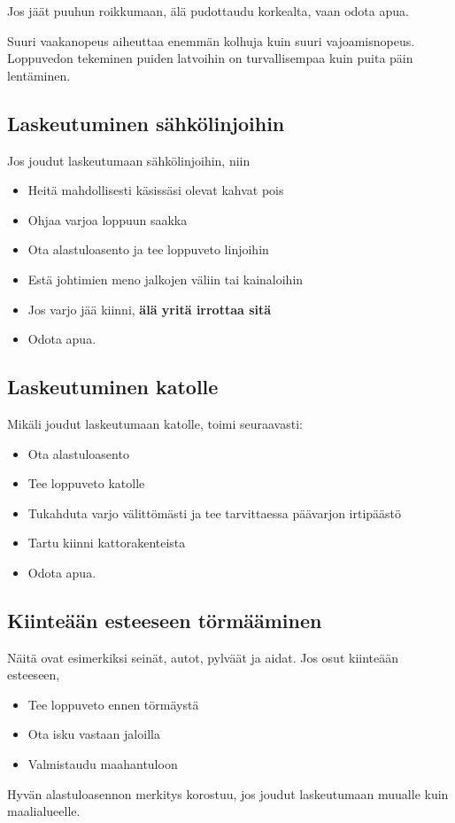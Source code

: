 Jos jäät puuhun roikkumaan, älä pudottaudu korkealta, vaan odota apua. 


Suuri vaakanopeus aiheuttaa enemmän kolhuja kuin suuri vajoamisnopeus. Loppuvedon tekeminen puiden latvoihin on turvallisempaa kuin puita päin lentäminen. 

\subsection{ Laskeutuminen sähkölinjoihin }
\label{mahdolliset-vaaratilanteet-laskeutuminen-sahkolinjoihin}


Jos joudut laskeutumaan sähkölinjoihin, niin 

\begin{itemize}
\item  Heitä mahdollisesti käsissäsi olevat kahvat pois 
\item  Ohjaa varjoa loppuun saakka 
\item  Ota alastuloasento ja tee loppuveto linjoihin 
\item  Estä johtimien meno jalkojen väliin tai kainaloihin 
\item  Jos varjo jää kiinni, \textbf{älä yritä irrottaa sitä} 
\item  Odota apua. 
\end{itemize}
\subsection{ Laskeutuminen katolle }
\label{mahdolliset-vaaratilanteet-laskeutuminen-katolle}


Mikäli joudut laskeutumaan katolle, toimi seuraavasti: 

\begin{itemize}
\item  Ota alastuloasento 
\item  Tee loppuveto katolle 
\item  Tukahduta varjo välittömästi ja tee tarvittaessa päävarjon irtipäästö 
\item  Tartu kiinni kattorakenteista 
\item  Odota apua. 
\end{itemize}
\subsection{ Kiinteään esteeseen törmääminen }
\label{mahdolliset-vaaratilanteet-kiinteaan-esteeseen-tormaaminen}


Näitä ovat esimerkiksi seinät, autot, pylväät ja aidat. Jos osut kiinteään esteeseen, 

\begin{itemize}
\item  Tee loppuveto ennen törmäystä 
\item  Ota isku vastaan jaloilla 
\item  Valmistaudu maahantuloon 
\end{itemize}

Hyvän alastuloasennon merkitys korostuu, jos joudut laskeutumaan muualle kuin maalialueelle. 

